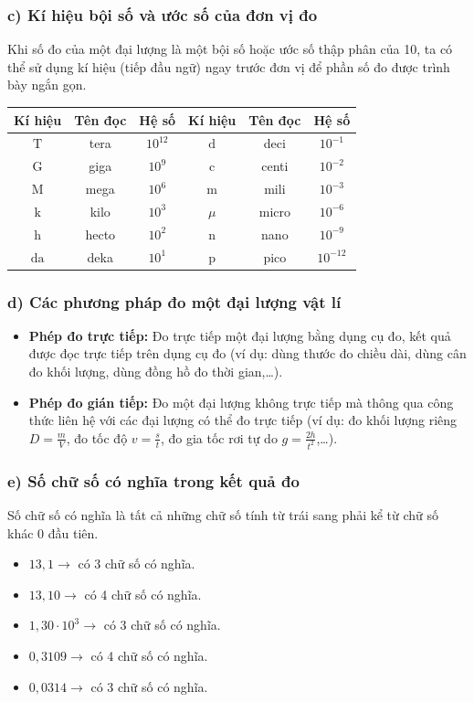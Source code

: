 \subsubsection*{c) Kí hiệu bội số và ước số của đơn vị đo}
Khi số đo của một đại lượng là một bội số hoặc ước số thập phân của 10, ta có thể sử dụng kí hiệu (tiếp đầu ngữ) ngay trước đơn vị để phần số đo được trình bày ngắn gọn.
\begin{center}
\renewcommand{\arraystretch}{1.15}
\begin{tabular}{|c|c|c||c|c|c|}
\hline
\textbf{Kí hiệu} & \textbf{Tên đọc} & \textbf{Hệ số} & \textbf{Kí hiệu} & \textbf{Tên đọc} & \textbf{Hệ số} \\
\hline
$\text{T}$ & tera & $10^{12}$ & $\text{d}$ & deci & $10^{-1}$ \\
$\text{G}$ & giga & $10^9$    & $\text{c}$ & centi & $10^{-2}$ \\
$\text{M}$ & mega & $10^6$    & $\text{m}$ & mili & $10^{-3}$ \\
$\text{k}$ & kilo & $10^3$    & $\mu$      & micro & $10^{-6}$ \\
$\text{h}$ & hecto & $10^2$   & $\text{n}$ & nano & $10^{-9}$ \\
$\text{da}$ & deka & $10^1$   & $\text{p}$ & pico & $10^{-12}$ \\
\hline
\end{tabular}
\end{center}

\subsubsection*{d) Các phương pháp đo một đại lượng vật lí}
\begin{itemize}
    \item \textbf{Phép đo trực tiếp:} Đo trực tiếp một đại lượng bằng dụng cụ đo, kết quả được đọc trực tiếp trên dụng cụ đo (ví dụ: dùng thước đo chiều dài, dùng cân đo khối lượng, dùng đồng hồ đo thời gian,\dots).
    \item \textbf{Phép đo gián tiếp:} Đo một đại lượng không trực tiếp mà thông qua công thức liên hệ với các đại lượng có thể đo trực tiếp (ví dụ: đo khối lượng riêng $D = \frac{m}{V}$, đo tốc độ $v = \frac{s}{t}$, đo gia tốc rơi tự do $g = \frac{2h}{t^2}$,\dots).
\end{itemize}

\subsubsection*{e) Số chữ số có nghĩa trong kết quả đo}
Số chữ số có nghĩa là tất cả những chữ số tính từ trái sang phải kể từ chữ số khác 0 đầu tiên.
\begin{itemize}
    \item $13{,}1 \longrightarrow$ có 3 chữ số có nghĩa.
    \item $13{,}10 \longrightarrow$ có 4 chữ số có nghĩa.
    \item $1{,}30 \cdot 10^3 \longrightarrow$ có 3 chữ số có nghĩa.
    \item $0{,}3109 \longrightarrow$ có 4 chữ số có nghĩa.
    \item $0{,}0314 \longrightarrow$ có 3 chữ số có nghĩa.
\end{itemize}

